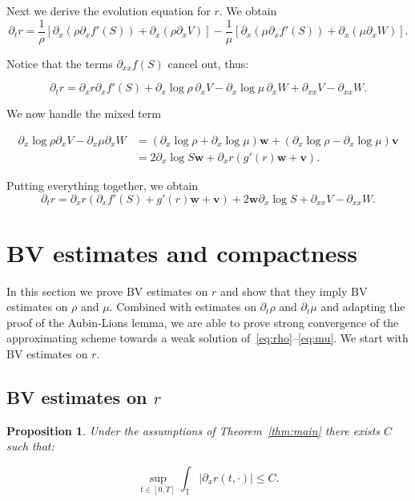 \documentclass[a4paper,twosided, 11pt]{article}
\newcommand {\T}  { {\mathbb{T}} }
\newcommand*{\vv}{\mathbf{v}}
\newcommand*{\ww}{\mathbf{w}}
\theoremstyle{plain}
\newtheorem{proposition}[thm]{Proposition}
\theoremstyle{remark}
\numberwithin{equation}{section}
\begin{document}
Next we derive the evolution equation for $r$. We obtain 
$$
\partial_t r 
= \frac{1}{\rho} \left[\partial_x(\rho\partial_x f'(S)) + \partial_x(\rho\partial_x V) \right]
 - \frac{1}{\mu} \left[\partial_x(\mu\partial_x f'(S)) + \partial_x(\mu\partial_x W) \right].
$$

Notice that the terms $\partial_{xx} f(S)$ cancel out, thus:

$$
\partial_t r 
= \partial_x r \partial_x f'(S)
 +  \partial_x \log\rho\, \partial_x V - \partial_x \log\mu\, \partial_x W 
 + \partial_{xx} V  - \partial_{xx} W.
$$

We now handle the mixed term 

\begin{align*}
\partial_x \log \rho \partial_x V - \partial_x \mu \partial_x W &= \left(\partial_x \log \rho + \partial_x \log\mu \right)\ww + \left(\partial_x \log \rho - \partial_x \log\mu \right)\vv\\
& =2\partial_x\log S\ww+ \partial_x r\left(g'(r)\ww +\vv\right) .
\end{align*}

Putting everything together, we obtain
\begin{equation}\label{eq:dtr}
\partial_t r = \partial_x r \left(\partial_x f'(S)+g'(r)\ww + \vv\right) + 2\ww\partial_x\log S + \partial_{xx}V-\partial_{xx}W.
\end{equation}

\section{BV estimates and compactness}

In this section we prove $\mathrm{BV}$ estimates on $r$ and show that they imply $\mathrm{BV}$ estimates on $\rho$ and $\mu$. Combined with estimates on $\partial_t\rho$ and $\partial_t\mu$ and adapting the proof of the Aubin-Lions lemma, we are able to prove strong convergence of the approximating scheme towards a weak solution of~\eqref{eq:rho}--\eqref{eq:mu}. We start with $\mathrm{BV}$ estimates on $r$. 

\subsection{BV estimates on $r$}


\begin{proposition}
Under the assumptions of Theorem~\ref{thm:main} there exists $C$ such that: 

$$
\sup_{t\in[0,T]}\int_{\T}|\partial_xr(t,\cdot)|\le C. 
$$
\end{proposition}
\end{document}
